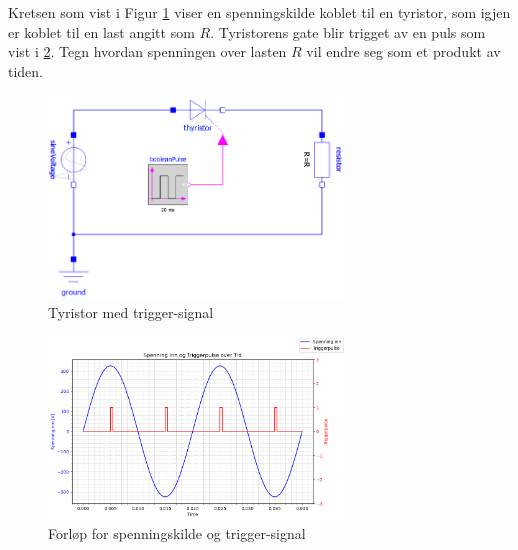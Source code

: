\begin{question}[name=Spørsmål, topic=tyristor]
Kretsen som vist i Figur \ref{fig:tyrTriggplot} viser en spenningskilde koblet til en tyristor, som igjen er koblet til en last angitt som $R$. Tyristorens gate blir trigget av en puls som vist i \ref{fig:tyrForTriggplot}. Tegn hvordan spenningen over lasten $R$ vil endre seg som et produkt av tiden.
\begin{figure}[H]
	\centering
	\includegraphics[width=0.7\textwidth]{tyristor/figurer/tyristor.png}
	\caption{Tyristor med trigger-signal}
	\label{fig:tyrTriggplot}
\end{figure}

\begin{figure}[H]
	\centering
	\includegraphics[width=0.7\textwidth]{tyristor/plot/tyristor3.png}
	\caption{Forløp for spenningskilde og trigger-signal}
	\label{fig:tyrForTriggplot}
\end{figure}


\end{question}

\vspace{0.5cm} %

